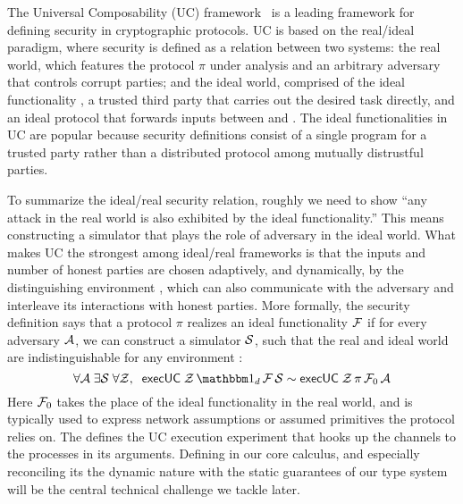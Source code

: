The Universal Composability (UC) framework~\cite{canettiUC} is a leading framework for defining security in cryptographic protocols.
UC is based on the real/ideal paradigm, where security is defined as a relation between two systems: the real world, which features the protocol $\pi$ under analysis and an arbitrary adversary \A that controls corrupt parties; and the ideal world, comprised of the ideal functionality \F, a trusted third party that carries out the desired task directly, and an ideal protocol \idealP that forwards inputs between \Z and \F. 
The ideal functionalities in UC are popular because security definitions consist of a single program for a trusted party rather than a distributed protocol among mutually distrustful parties.

To summarize the ideal/real security relation, roughly we need to show ``any attack in the real world is also exhibited by the ideal functionality.'' This means constructing a simulator \Sim that plays the role of adversary in the ideal world.
What makes UC the strongest among ideal/real frameworks is that the inputs and number of honest parties are chosen adaptively, and dynamically, by the distinguishing environment \Z, which can also communicate with the adversary and interleave its interactions with honest parties.
More formally, the security definition says that a protocol $\pi$ realizes an ideal functionality $\mathcal{F}$
if for every adversary $\mathcal{A}$, we can construct a simulator $\mathcal{S}$, such that the real and ideal world are indistinguishable for any environment \Z:
\begin{equation}
  \label{eqn:emulation}
  \forall \A \; \exists \Sim \; \forall \Z, \; \; \msf{execUC} \; \Z \, \idealP \, \F \, \Sim \sim \msf{execUC} \; \Z \, \pi \, \F_0 \, \A
\end{equation}
Here $\mathcal{F}_0$ takes the place of the ideal functionality in the real world, and is typically used to express network assumptions or assumed primitives the protocol relies on.
The  defines the UC execution experiment that hooks up the channels to the processes in its arguments.
Defining  in our core calculus, and especially reconciling its the dynamic nature with the static guarantees of our type system will be the central technical challenge we tackle later.

